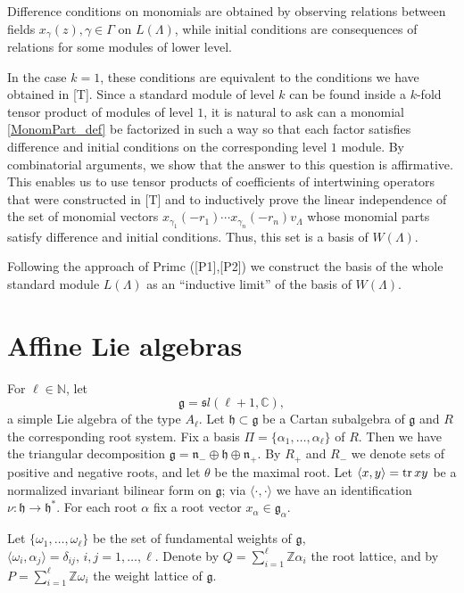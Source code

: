 \documentclass[a4paper, 10pt,oneside]{amsart}
\begin{document}
Difference conditions on monomials are obtained by observing
relations between fields $x_\gamma(z),\gamma\in\Gamma$ on
$L(\Lambda)$, while initial conditions are consequences of relations for some
modules of lower level.

In the case $k=1$, these conditions are equivalent to the conditions
we have obtained in [T]. Since a standard module of level $k$ can be found inside a $k$-fold tensor product of modules of level $1$,
it is natural to ask  can a monomial \eqref{MonomPart_def} be factorized in such a way so that each factor satisfies difference and initial
conditions on the corresponding level $1$ module. By combinatorial arguments, we show that the answer to this question is affirmative. This
enables us to use tensor products of coefficients of intertwining operators that were constructed in [T] and to inductively prove the linear
independence of the set of
monomial vectors $x_{\gamma_1}(-r_1) \cdots x_{\gamma_n}(-r_n) v_\Lambda$
whose monomial parts satisfy difference and initial  conditions. Thus, this set is a basis of $W(\Lambda)$.

Following the approach of Primc ([P1],[P2]) we construct the basis of the whole standard module  $L(\Lambda)$ as an ``inductive limit'' of
the basis of $W(\Lambda)$.

\section{Affine Lie algebras}

For $\ell\in {{\mathbb N}}$, let $${{\mathfrak g}}={{\mathfrak sl}}(\ell+1,{{\mathbb C}}),$$ a simple Lie algebra
of the type $A_\ell$. Let ${{\mathfrak h}}\subset{{\mathfrak g}}$ be a Cartan subalgebra of
${{\mathfrak g}}$ and $R$ the corresponding root system. Fix a basis
$\Pi=\{\alpha_1,\dots,\alpha_\ell\}$ of $R$. Then we have the
triangular decomposition ${{\mathfrak g}}={{\mathfrak n}}_-\oplus {{\mathfrak h}} \oplus {{\mathfrak n}}_+$. By $R_+$
and $R_-$ we denote sets of positive and negative roots, and let
$\theta$ be the maximal root. Let $\langle
x,y\rangle=\textrm{tr\,}xy$ be a normalized invariant bilinear form on
${{\mathfrak g}}$; via $\langle \cdot,\cdot\rangle$ we have an identification
$\nu:{{\mathfrak h}}\to{{\mathfrak h}}^*$. For each root $\alpha$ fix a root vector $x_\alpha\in{{\mathfrak g}}_\alpha$.

Let $\{\omega_1,\dots,\omega_\ell\}$ be the set of
fundamental weights of ${{\mathfrak g}}$,
$\langle\omega_i,\alpha_j\rangle=\delta_{ij},\,i,j=1,\dots,\ell$. Denote by $Q=\sum_{i=1}^\ell{{\mathbb Z}} \alpha_i$
the root lattice, and by $P=\sum_{i=1}^\ell{{\mathbb Z}} \omega_i$ the weight lattice
of ${{\mathfrak g}}$.
\end{document}
